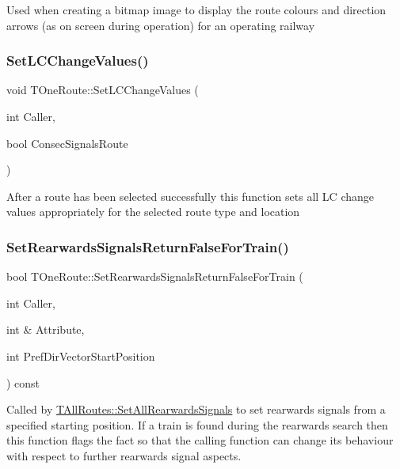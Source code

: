 Used when creating a bitmap image to display the route colours and direction arrows (as on screen during operation) for an operating railway \mbox{\label{class_t_one_route_a92dbe2a2df334da0b20e54683c0fba8e}} 
\subsubsection{\texorpdfstring{Set\+L\+C\+Change\+Values()}{SetLCChangeValues()}}
{\footnotesize\ttfamily void T\+One\+Route\+::\+Set\+L\+C\+Change\+Values (\begin{DoxyParamCaption}\item[{int}]{Caller,  }\item[{bool}]{Consec\+Signals\+Route }\end{DoxyParamCaption})}

After a route has been selected successfully this function sets all LC change values appropriately for the selected route type and location \mbox{\label{class_t_one_route_a55e04e36f652344b5215f8a28143c4a3}} 
\subsubsection{\texorpdfstring{Set\+Rearwards\+Signals\+Return\+False\+For\+Train()}{SetRearwardsSignalsReturnFalseForTrain()}}
{\footnotesize\ttfamily bool T\+One\+Route\+::\+Set\+Rearwards\+Signals\+Return\+False\+For\+Train (\begin{DoxyParamCaption}\item[{int}]{Caller,  }\item[{int \&}]{Attribute,  }\item[{int}]{Pref\+Dir\+Vector\+Start\+Position }\end{DoxyParamCaption}) const}

Called by \mbox{\hyperlink{class_t_all_routes_ac6bd39457747eaa96476a8a87df15ac2}{T\+All\+Routes\+::\+Set\+All\+Rearwards\+Signals}} to set rearwards signals from a specified starting position. If a train is found during the rearwards search then this function flags the fact so that the calling function can change its behaviour with respect to further rearwards signal aspects. \mbox{\label{class_t_one_route_a8f8fe8f852dd24cf8d12933f22b5750c}} 
